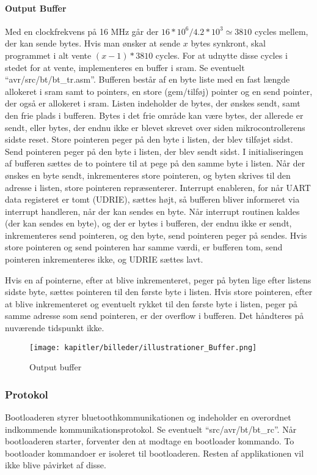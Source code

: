 \paragraph{Output Buffer}
Med en clockfrekvens på 16 MHz går der $16*10^6 / 4.2*10^3 \simeq 3810$ cycles mellem, der kan sende bytes. Hvis man ønsker at sende $x$ bytes synkront, skal programmet i alt vente $(x-1)*3810$ cycles. For at udnytte disse cycles i stedet for at vente, implementeres en buffer i sram.
Se eventuelt \mbox{``avr/src/bt/bt\_tr.asm''}.
Bufferen består af en byte liste med en fast længde allokeret i sram samt to pointers, en store (gem/tilføj) pointer og en send pointer, der også er allokeret i sram. Listen indeholder de bytes, der ønskes sendt, samt den frie plads i bufferen. Bytes i det frie område kan være bytes, der allerede er sendt, eller bytes, der endnu ikke er blevet skrevet over siden mikrocontrollerens sidste reset. Store pointeren peger på den byte i listen, der blev tilføjet sidst. Send pointeren peger på den byte i listen, der blev sendt sidst.
I initialiseringen af bufferen sættes de to pointere til at pege på den samme byte i listen.
Når der ønskes en byte sendt, inkrementeres store pointeren, og byten skrives til den adresse i listen, store pointeren repræsenterer. Interrupt enableren, for når UART data registeret er tomt (UDRIE), sættes højt, så bufferen bliver informeret via interrupt handleren, når der kan sendes en byte.
Når interrupt routinen kaldes (der kan sendes en byte), og der er bytes i bufferen, der endnu ikke er sendt, inkrementeres send pointeren, og den byte, send pointeren peger på sendes. Hvis store pointeren og send pointeren har samme værdi, er bufferen tom, send pointeren inkrementeres ikke, og UDRIE sættes lavt.

Hvis en af pointerne, efter at blive inkrementeret, peger på byten lige efter listens sidste byte, sættes pointeren til den første byte i listen.
Hvis store pointeren, efter at blive inkrementeret og eventuelt rykket til den første byte i listen, peger på samme adresse som send pointeren, er der overflow i bufferen. Det håndteres på nuværende tidspunkt ikke.

\begin{figure}[ht]
    \centering
    \texttt{[image: kapitler/billeder/illustrationer\_Buffer.png]}
    \caption{Output buffer}
    \label{fig:buffer}
\end{figure}

\subsubsection{Protokol}
Bootloaderen styrer bluetoothkommunikationen og indeholder en overordnet indkommende kommunikationsprotokol.
Se eventuelt \mbox{``src/avr/bt/bt\_rc''}.
Når bootloaderen starter, forventer den at modtage en bootloader kommando.
To bootloader kommandoer er isoleret til bootloaderen. Resten af applikationen vil ikke blive påvirket af disse.

